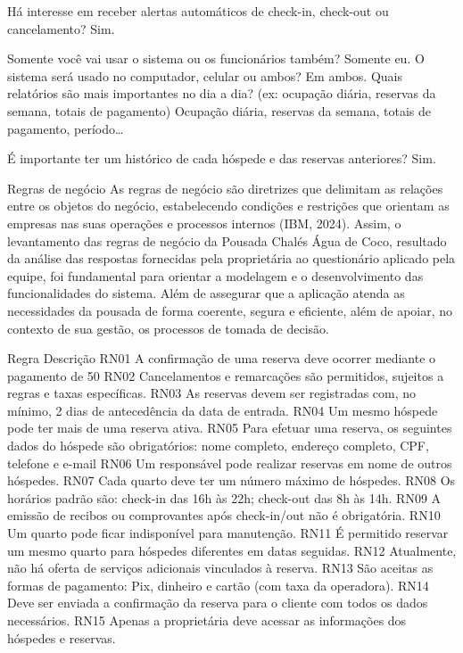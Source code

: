 	Há interesse em receber alertas automáticos de check-in, check-out ou cancelamento?
	Sim.




	

Somente você vai usar o sistema ou os funcionários também?
	Somente eu.
	 O sistema será usado no computador, celular ou ambos?
	Em ambos.
	Quais relatórios são mais importantes no dia a dia? (ex: ocupação diária, reservas da semana, totais de pagamento)
	Ocupação diária, reservas da semana, totais de pagamento, período…


	É importante ter um histórico de cada hóspede e das reservas anteriores?
	Sim.


	Regras de negócio
        As regras de negócio são diretrizes que delimitam as relações entre os objetos do negócio, estabelecendo condições e restrições que orientam as empresas nas suas operações e processos internos (IBM, 2024).
Assim, o levantamento das regras de negócio da Pousada Chalés Água de Coco, resultado da análise das respostas fornecidas pela proprietária ao questionário aplicado pela equipe, foi fundamental para orientar a modelagem e o desenvolvimento das funcionalidades do sistema. Além de assegurar que a aplicação atenda as necessidades da pousada de forma coerente, segura  e eficiente, além de apoiar, no contexto de sua gestão, os processos de tomada de decisão. 




Regra
	Descrição 
	RN01
	A confirmação de uma reserva deve ocorrer mediante o pagamento de 50%
	RN02
	Cancelamentos e remarcações são permitidos, sujeitos a regras e taxas específicas.
	RN03
	As reservas devem ser registradas com, no mínimo, 2 dias de antecedência da data de entrada.
	RN04
	Um mesmo hóspede pode ter mais de uma reserva ativa.
	RN05
	Para efetuar uma reserva, os seguintes dados do hóspede são obrigatórios: nome completo, endereço completo, CPF, telefone e e-mail
	RN06
	Um responsável pode realizar reservas em nome de outros hóspedes.
	RN07
	Cada quarto deve ter um número máximo de hóspedes.
	RN08
	Os horários padrão são: check-in das 16h às 22h; check-out das 8h às 14h.
	RN09
	A emissão de recibos ou comprovantes após check-in/out não é obrigatória.
	RN10
	Um  quarto pode ficar indisponível para manutenção.
	RN11
	É permitido reservar um mesmo quarto para hóspedes diferentes em datas seguidas.
	RN12
	Atualmente, não há oferta de serviços adicionais vinculados à reserva.
	RN13
	São aceitas as formas de pagamento: Pix, dinheiro e cartão (com taxa da operadora).
	RN14
	Deve ser enviada a confirmação da reserva para o cliente com todos os dados necessários.
	RN15
	Apenas a proprietária deve acessar as informações dos hóspedes e reservas.
	







